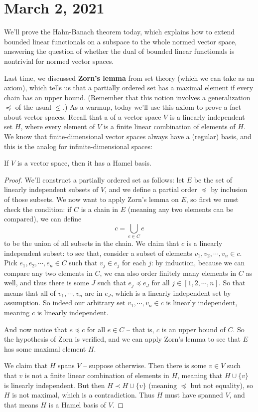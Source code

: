 \pagebreak\section{March 2, 2021}

We'll prove the Hahn-Banach theorem today, which explains how to extend bounded linear functionals on a subspace to the whole normed vector space, answering the question of whether the dual of bounded linear functionals is nontrivial for normed vector spaces. 

Last time, we discussed \textbf{Zorn's lemma} from set theory (which we can take as an axiom), which tells us that a partially ordered set has a maximal element if every chain has an upper bound. (Remember that this notion involves a generalization $\preceq$ of the usual $\le$.) As a warmup, today we'll use this axiom to prove a fact about vector spaces. Recall that a  of a vector space $V$ is a linearly independent set $H$, where every element of $V$ is a finite linear combination of elements of $H$. We know that finite-dimensional vector spaces always have a (regular) basis, and this is the analog for infinite-dimensional spaces:

\begin{theorem}
If $V$ is a vector space, then it has a Hamel basis.
\end{theorem}
\begin{proof}
We'll construct a partially ordered set as follows: let $E$ be the set of linearly independent subsets of $V$, and we define a partial order $\preceq$ by inclusion of those subsets. We now want to apply Zorn's lemma on $E$, so first we must check the condition: if $C$ is a chain in $E$ (meaning any two elements can be compared), we can define 
\[
    c = \bigcup_{e \in C} e
\]
to be the union of all subsets in the chain. We claim that $c$ is a linearly independent subset: to see that, consider a subset of elements $v_1, v_2, \cdots, v_n \in c$. Pick $e_1, e_2, \cdots, e_n \in C$ such that $v_j \in e_j$ for each $j$: by induction, because we can compare any two elements in $C$, we can also order finitely many elements in $C$ as well, and thus there is some $J$ such that $e_j \preceq e_J$ for all $j \in [1, 2, \cdots, n]$. So that means that all of $v_1, \cdots, v_n$ are in $e_J$, which is a linearly independent set by assumption. So indeed our arbitrary set $v_1, \cdots, v_n \in c$ is linearly independent, meaning $c$ is linearly independent.

And now notice that $e \preceq c$ for all $e \in C$ -- that is, $c$ is an upper bound of $C$. So the hypothesis of Zorn is verified, and we can apply Zorn's lemma to see that $E$ has some maximal element $H$.

We claim that $H$ spans $V$ -- suppose otherwise. Then there is some $v \in V$ such that $v$ is not a finite linear combination of elements in $H$, meaning that $H \cup \{v\}$ is linearly independent. But then $H \prec H \cup\{v\}$ (meaning $\preceq$ but not equality), so $H$ is not maximal, which is a contradiction. Thus $H$ must have spanned $V$, and that means $H$ is a Hamel basis of $V$. 
\end{proof}

